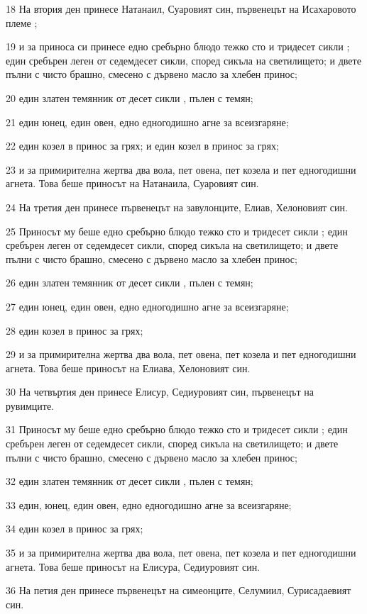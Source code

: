\par 18 На втория ден принесе Натанаил, Суаровият син, първенецът на Исахаровото племе ;
\par 19 и за приноса си принесе едно сребърно блюдо тежко сто и тридесет сикли ; един сребърен леген от седемдесет сикли, според сикъла на светилището; и двете пълни с чисто брашно, смесено с дървено масло за хлебен принос;
\par 20 един златен темянник от десет сикли , пълен с темян;
\par 21 един юнец, един овен, едно едногодишно агне за всеизгаряне;
\par 22 един козел в принос за грях; и един козел в принос за грях;
\par 23 и за примирителна жертва два вола, пет овена, пет козела и пет едногодишни агнета. Това беше приносът на Натанаила, Суаровият син.
\par 24 На третия ден принесе първенецът на завулонците, Елиав, Хелоновият син.
\par 25 Приносът му беше едно сребърно блюдо тежко сто и тридесет сикли ; един сребърен леген от седемдесет сикли, според сикъла на светилището; и двете пълни с чисто брашно, смесено с дървено масло за хлебен принос;
\par 26 един златен темянник от десет сикли , пълен с темян;
\par 27 един юнец, един овен, едно едногодишно агне за всеизгаряне;
\par 28 един козел в принос за грях;
\par 29 и за примирителна жертва два вола, пет овена, пет козела и пет едногодишни агнета. Това беше приносът на Елиава, Хелоновият син.
\par 30 На четвъртия ден принесе Елисур, Седиуровият син, първенецът на рувимците.
\par 31 Приносът му беше едно сребърно блюдо тежко сто и тридесет сикли ; един сребърен леген от седемдесет сикли, според сикъла на светилището; и двете пълни с чисто брашно, смесено с дървено масло за хлебен принос;
\par 32 един златен темянник от десет сикли , пълен с темян;
\par 33 един, юнец, един овен, едно едногодишно агне за всеизгаряне;
\par 34 един козел в принос за грях;
\par 35 и за примирителна жертва два вола, пет овена, пет козела и пет едногодишни агнета. Това беше приносът на Елисура, Седиуровият син.
\par 36 На петия ден принесе първенецът на симеонците, Селумиил, Сурисадаевият син.
